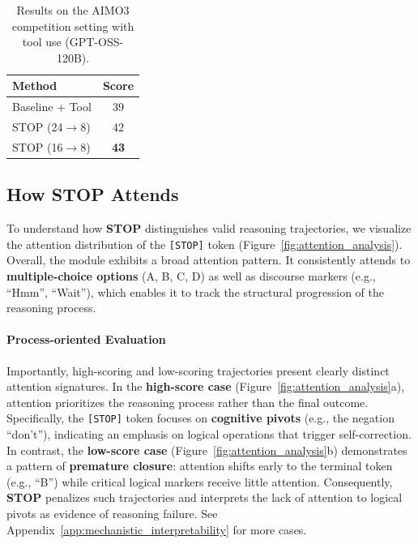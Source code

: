 \documentclass[11pt]{article}
\theoremstyle{plain}
\newtheorem{findings}{Findings}
\begin{document}

\begin{table}[h]
\centering
\small
\setlength{\tabcolsep}{5pt}
\caption{Results on the AIMO3 competition setting with tool use (GPT-OSS-120B).}
\label{tab:ablation_tool}
\begin{tabular}{l c}
\toprule
\textbf{Method} & \textbf{Score} \\
\midrule
Baseline + Tool & 39 \\
STOP (24$\rightarrow$8) & 42 \\
STOP (16$\rightarrow$8) & \textbf{43} \\
\bottomrule
\end{tabular}
\vspace{-3mm}
\end{table}

\subsection{How STOP Attends}
\label{subsec:interpretability}
To understand how \textbf{STOP} distinguishes valid reasoning trajectories, we visualize the attention distribution of the \texttt{[STOP]} token (Figure~\ref{fig:attention_analysis}).
Overall, the module exhibits a broad attention pattern. It consistently attends to \textbf{multiple-choice options} (A, B, C, D) as well as discourse markers (e.g., ``Hmm'', ``Wait''), which enables it to track the structural progression of the reasoning process.

\paragraph{Process-oriented Evaluation}
Importantly, high-scoring and low-scoring trajectories present clearly distinct attention signatures.
In the \textbf{high-score case} (Figure~\ref{fig:attention_analysis}a), attention prioritizes the reasoning process rather than the final outcome.
Specifically, the \texttt{[STOP]} token focuses on \textbf{cognitive pivots} (e.g., the negation ``don't''), indicating an emphasis on logical operations that trigger self-correction.
In contrast, the \textbf{low-score case} (Figure~\ref{fig:attention_analysis}b) demonstrates a pattern of \textbf{premature closure}: attention shifts early to the terminal token (e.g., ``B'') while critical logical markers receive little attention.
Consequently, \textbf{STOP} penalizes such trajectories and interprets the lack of attention to logical pivots as evidence of reasoning failure.
See Appendix~\ref{app:mechanistic_interpretability} for more cases.
\end{document}
